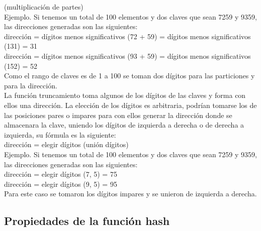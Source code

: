 \documentclass[letterpaper,openright,12pt]{report}
\begin{document}
(multiplicación de partes)\\[0.4cm] Ejemplo. Si tenemos un total de 100
elementos y dos claves que sean 7259 y 9359, las direcciones generadas
son las siguientes:\\ dirección = dígitos menos significativos (72 + 59)
= dígitos menos significativos (131) = 31\\ dirección = dígitos menos
significativos (93 + 59) = dígitos menos significativos (152) = 52\\[0.4cm]
Como el rango de claves es de 1 a 100 se toman dos dígitos para las
particiones y para la dirección.\\ La función truncamiento toma algunos
de los dígitos de las claves y forma con ellos una dirección. La
elección de los dígitos es arbitraria, podrían tomarse los de las
posiciones pares o impares para con ellos generar la dirección donde se
almacenara la clave, uniendo los dígitos de izquierda a derecha o de
derecha a izquierda, su fórmula es la siguiente:\\[0.4cm] dirección = elegir
dígitos (unión dígitos)\\ Ejemplo. Si tenemos un total de 100 elementos
y dos claves que sean 7259 y 9359, las direcciones generadas son las
siguientes:\\ dirección = elegir dígitos (7, 5) = 75\\ dirección =
elegir dígitos (9, 5) = 95\\[0.4cm] Para este caso se tomaron los dígitos
impares y se unieron de izquierda a derecha.
\newpage

\subsection{Propiedades de la función hash}
\end{document}
